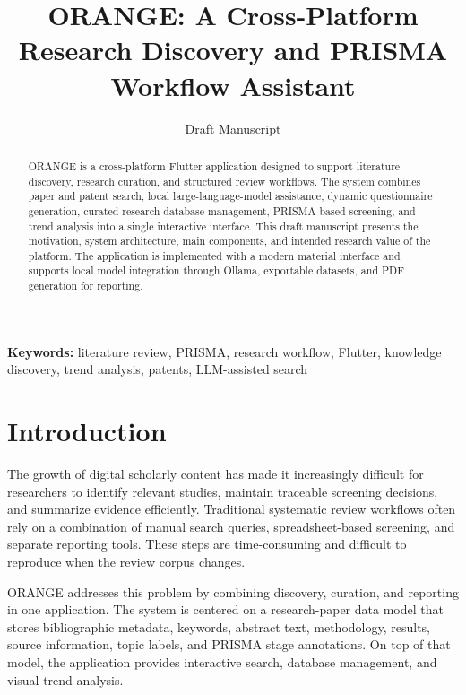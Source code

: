 \documentclass[11pt,a4paper]{article}
\title{ORANGE: A Cross-Platform Research Discovery and PRISMA Workflow Assistant}
\author{Draft Manuscript}
\date{}
\begin{document}
\maketitle

\begin{abstract}
ORANGE is a cross-platform Flutter application designed to support literature discovery, research curation, and structured review workflows. The system combines paper and patent search, local large-language-model assistance, dynamic questionnaire generation, curated research database management, PRISMA-based screening, and trend analysis into a single interactive interface. This draft manuscript presents the motivation, system architecture, main components, and intended research value of the platform. The application is implemented with a modern material interface and supports local model integration through Ollama, exportable datasets, and PDF generation for reporting.
\end{abstract}

\noindent\textbf{Keywords:} literature review, PRISMA, research workflow, Flutter, knowledge discovery, trend analysis, patents, LLM-assisted search

\section{Introduction}
The growth of digital scholarly content has made it increasingly difficult for researchers to identify relevant studies, maintain traceable screening decisions, and summarize evidence efficiently. Traditional systematic review workflows often rely on a combination of manual search queries, spreadsheet-based screening, and separate reporting tools. These steps are time-consuming and difficult to reproduce when the review corpus changes.

ORANGE addresses this problem by combining discovery, curation, and reporting in one application. The system is centered on a research-paper data model that stores bibliographic metadata, keywords, abstract text, methodology, results, source information, topic labels, and PRISMA stage annotations. On top of that model, the application provides interactive search, database management, and visual trend analysis.
\end{document}
